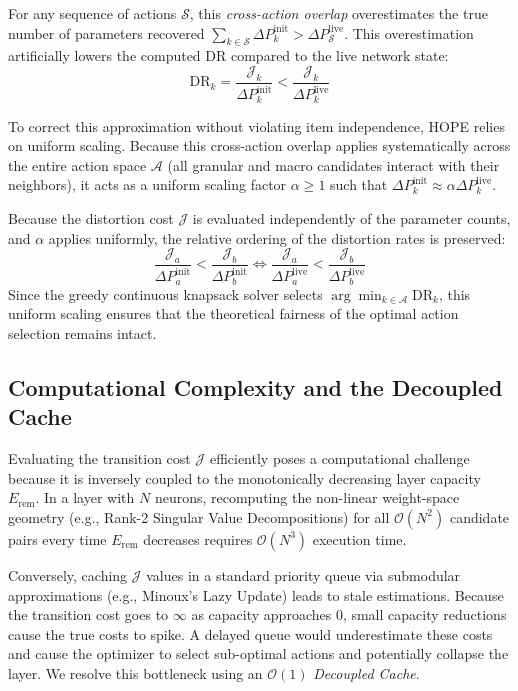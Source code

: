 \documentclass[11pt, a4paper, copyright, gdm]{google}
\newcommand{\calA}{\mathcal{A}}
\newcommand{\calJ}{\mathcal{J}}
\newcommand{\calO}{\mathcal{O}}
\newcommand{\calS}{\mathcal{S}}
\theoremstyle{definition}
\begin{document}
For any sequence of actions $\calS$, this \textit{cross-action overlap} overestimates the true number of parameters recovered $\sum_{k \in \calS} \Delta P_k^{\text{init}} > \Delta P_{\calS}^{\text{live}}$. This overestimation artificially lowers the computed DR compared to the live network state:
\begin{equation}
\text{DR}_k = \frac{\calJ_k}{\Delta P_k^{\text{init}}} < \frac{\calJ_k}{\Delta P_k^{\text{live}}}
\end{equation}

To correct this approximation without violating item independence, HOPE relies on uniform scaling. Because this cross-action overlap applies systematically across the entire action space $\calA$ (all granular and macro candidates interact with their neighbors), it acts as a uniform scaling factor $\alpha \ge 1$ such that $\Delta P_k^{\text{init}} \approx \alpha \Delta P_k^{\text{live}}$.

Because the distortion cost $\calJ$ is evaluated independently of the parameter counts, and $\alpha$ applies uniformly, the relative ordering of the distortion rates is preserved:
\begin{equation}
\frac{\calJ_a}{\Delta P_a^{\text{init}}} < \frac{\calJ_b}{\Delta P_b^{\text{init}}} \iff \frac{\calJ_a}{\Delta P_a^{\text{live}}} < \frac{\calJ_b}{\Delta P_b^{\text{live}}}
\end{equation}
Since the greedy continuous knapsack solver selects $\arg\min_{k \in \calA} \text{DR}_k$, this uniform scaling ensures that the theoretical fairness of the optimal action selection remains intact.

\subsection{Computational Complexity and the Decoupled Cache}
\label{sec:decoupled_cache}

Evaluating the transition cost $\calJ$ efficiently poses a computational challenge because it is inversely coupled to the monotonically decreasing layer capacity $E_{\text{rem}}$. In a layer with $N$ neurons, recomputing the non-linear weight-space geometry (e.g., Rank-2 Singular Value Decompositions) for all $\calO(N^2)$ candidate pairs every time $E_{\text{rem}}$ decreases requires $\calO(N^3)$ execution time. 

Conversely, caching $\calJ$ values in a standard priority queue via submodular approximations (e.g., Minoux's Lazy Update) leads to stale estimations. Because the transition cost goes to $\infty$ as capacity approaches $0$, small capacity reductions cause the true costs to spike. A delayed queue would underestimate these costs and cause the optimizer to select sub-optimal actions and potentially collapse the layer. We resolve this bottleneck using an $\calO(1)$ \textit{Decoupled Cache}.
\end{document}

